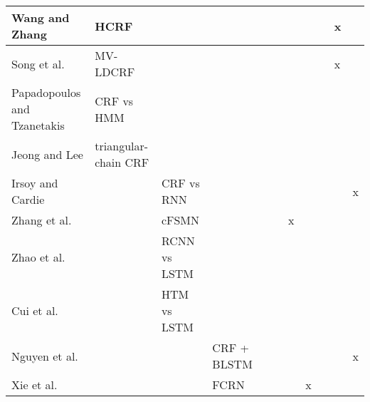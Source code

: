 \begin{landscape}
\begin{table}[!ht]
\begin{tabular}{l|l|l|l|l|l|l|l|l|l|l}
Wang and Zhang \cite{wang_ica_2013}                          & HCRF                 &              &             &                               &             &        &             &         & x      &                        \\ \hline
Song et al. \cite{song_multi-view_2012}                      & MV-LDCRF             &              &             &                               &             &        &             &         & x      &                        \\ \hline
Papadopoulos and Tzanetakis \cite{papadopoulos_models_2017}  & CRF vs HMM           &              &             &                               &             &        &             &         &        &                        \\ \hline
Jeong and Lee \cite{jeong_triangular-chain_2008}             & triangular-chain CRF &              &             &                               &             &        &             &         &        &                        \\ \hline
\hline
Irsoy and Cardie \cite{irsoy_opinion_2014}                   &                      & CRF vs RNN   &             &                               &             &        &             &         &        & x                      \\ \hline
Zhang et al. \cite{zhang_nonrecurrent_2017}                  &                      & cFSMN        &             &                               &             & x      &             &         &        &                        \\ \hline
Zhao et al. \cite{zhao_recurrent_2017}                       &                      & RCNN vs LSTM &             &                               &             &        &             &         &        &                        \\ \hline
Cui et al. \cite{cui_continuous_2016}                        &                      & HTM vs LSTM  &             &                               &             &        &             &         &        &                        \\ \hline
\hline
Nguyen et al. \cite{nguyen_recurrent_2018}                   &                      &              & CRF + BLSTM &                               &             &        &             &         &        & x                      \\ \hline
Xie et al. \cite{xie_fully_2016}                             &                      &              & FCRN        &                               &             &        & x           &         &        &                        \\ \hline

\end{tabular}
\end{table}
\end{landscape}
